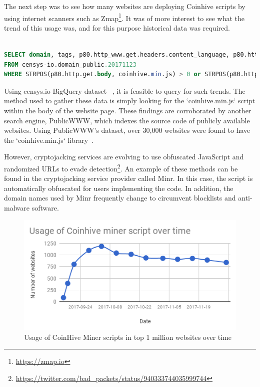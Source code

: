 The next step was to see how many websites are deploying Coinhive scripts by using internet scanners such as Zmap\footnote{\url{https://zmap.io}}. It was of more interest to see what the trend of this usage was, and for this purpose historical data was required. 

\begin{lstlisting}[caption={BigQuery SQL query to find websites using coinhive miner script using censys.io datasets},label={lst:bigquery},language=sql,linewidth=\linewidth]

SELECT domain, tags, p80.http_www.get.headers.content_language, p80.http_www.get.headers.server, p80.http.get.headers.x_powered_by, p80.http.get.title, p80.http_www.get.body as wwwbody, p80.http.get.body as plainbody 
FROM censys-io.domain_public.20171123
WHERE STRPOS(p80.http.get.body, coinhive.min.js) > 0 or STRPOS(p80.http_www.get.body, coinhive.min.js) >0)

\end{lstlisting}

Using censys.io BigQuery dataset ~\cite{censys15}, it is feasible to query for such trends. The method used to gather these data is simply looking for the `coinhive.min.js` script within the body of the website page. These findings are corroborated by another search engine, PublicWWW, which indexes the source code of publicly available websites. Using PublicWWW's dataset, over 30,000 websites were found to have the `coinhive.min.js` library~\cite{badpacketspublicwww}.
 
However, cryptojacking services are evolving to use obfuscated JavaScript and randomized URLs to evade detection\footnote{\url{https://twitter.com/bad_packets/status/940333744035999744}}. An example of these methods can be found in the cryptojacking service provider called Minr. In this case, the script is automatically obfuscated for users implementing the code. In addition, the domain names used by Minr frequently change to circumvent blocklists and anti-malware software.

\begin{figure}[t]
\centering
\includegraphics[width=\linewidth]{figures/usage_of_coinhive_over_time.png}
\caption{Usage of CoinHive Miner scripts in top 1 million websites over time}
\end{figure}


